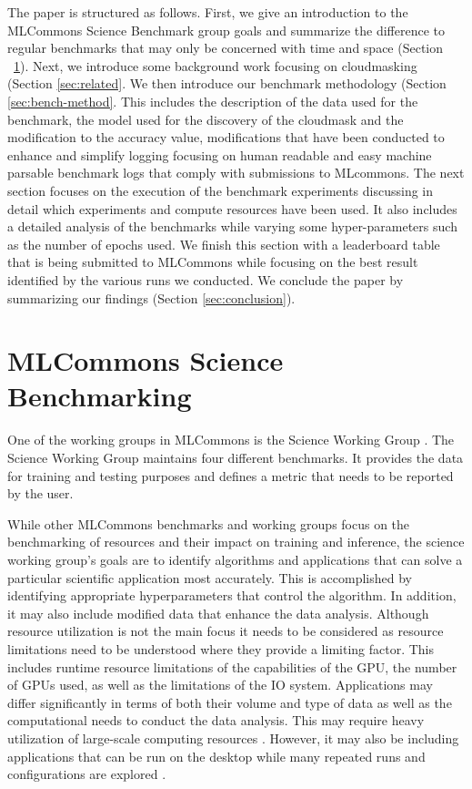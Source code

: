 \documentclass[sigplan,screen]{acmart}
\begin{document}
The paper is structured as follows. First, we give an introduction to the MLCommons Science Benchmark group goals and summarize the difference to regular benchmarks that may only be concerned with time and space (Section ~\ref{sec:mlcommons}). Next, we introduce some background work focusing on cloudmasking (Section \ref{sec:related}. We then introduce our benchmark methodology (Section \ref{sec:bench-method}. This includes the description of the data used for the benchmark, the model used for the discovery of the cloudmask and the modification to the accuracy value, modifications that have been conducted to enhance and simplify logging focusing on human readable and easy machine parsable benchmark logs that comply with submissions to MLcommons. The next section focuses on the execution of the benchmark experiments discussing in detail which experiments and compute resources have been used. It also includes a detailed analysis of the benchmarks while varying some hyper-parameters such as the number of epochs used. We finish this section with a leaderboard table that is being submitted to MLCommons while focusing on the best result identified by the various runs we conducted. We conclude the paper by summarizing our findings (Section \ref{sec:conclusion}). 


\section{MLCommons Science Benchmarking}
\label{sec:mlcommons}


One of the working groups in MLCommons is the Science Working Group \cite{Thiyagalingam2022AIBF}. The Science Working Group maintains four different benchmarks. It provides the data for training and testing purposes and defines a metric that needs to be reported by the user. 

While other MLCommons benchmarks and working groups focus on the benchmarking of resources and their impact on training and inference, the science working group's goals are to identify algorithms and applications that can solve a particular scientific application most accurately. This is accomplished by identifying appropriate hyperparameters that control the algorithm. In addition, it may also include modified data that enhance the data analysis. Although resource 
utilization is not the main focus it needs to be considered as resource limitations need to be understood where they provide a limiting factor. This includes runtime resource limitations of the capabilities of the GPU, the number of GPUs used, as well as the limitations of the IO system. Applications may differ significantly in terms of both their volume and type of data as well as the computational needs to conduct the data analysis. This may require heavy utilization of large-scale computing resources \cite{Farrell2021MLPerfHA}. However, it may also be including applications that can be run on the desktop while many repeated runs and configurations are explored \cite{las23-insights-mlcommons-education}. 
\end{document}
